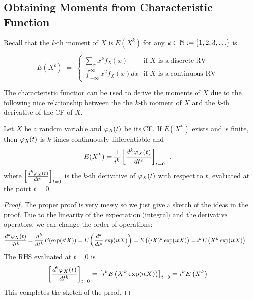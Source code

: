 \subsection{Obtaining Moments from Characteristic Function}

Recall that the $k$-th moment of $X$ is $E(X^k)$ for any $k \in \mathbb{N}:=\{1,2,3,\ldots\}$ is
\begin{framed}
\[
E(X^k)\; =\;
\begin{cases}
\displaystyle \sum_x x^k f_X(x) & \text{if $X$ is a discrete RV}\\[12pt]
\displaystyle \int_{-\infty}^{\infty} x^2 f_X(x) dx & \text{if $X$ is a continuous RV}
\end{cases}
\]
\end{framed}

The characteristic function can be used to derive the moments of $X$ due to the following nice relationship between the the $k$-th moment of $X$ and the $k$-th derivative of the CF of $X$.

\begin{framed}
\begin{prop}[Moment \& CF.]
Let $X$ be a random variable and $\varphi_X(t)$ be its CF.  
If $E(X^k)$ exists and is finite, then $\varphi_X(t)$ is $k$ times continuously differentiable and
\begin{equation*}
E(X^k) = \frac{1}{\imath^k} \left[\frac{d^k \varphi_X(t)}{dt^k}\right]_{t=0} \enspace .
\end{equation*}
where $\left[\frac{d^k \varphi_X(t)}{dt^k}\right]_{t=0}$ is the $k$-th derivative of $\varphi_X(t)$ with respect to $t$, evaluated at the point $t=0$.
\end{prop}
\end{framed}

\begin{proof}
The proper proof is very messy so we just give a sketch of the ideas in the proof.  
Due to the linearity of the expectation (integral) and the derivative operators, we can change the order of operations:
\begin{align*}
\frac{d^k \varphi_X(t)}{dt^k}
&= \frac{d^k}{dt^k} E(\exp(\imath t X))
= E \left( \frac{d^k}{dt^k} \exp(\imath t X) \right)
= E \left( (\imath X)^k \exp(\imath t X) \right)
= \imath^k E \left( X^k \exp(\imath t X) \right)
\end{align*}
The RHS evaluated at $t=0$ is
\[
\left[ \frac{d^k \varphi_X(t)}{dt^k} \right]_{t=0}
= \left[ \imath^k E \left( X^k \exp(\imath t X) \right) \right]_{t=0} 
= \imath^k E \left( X^k \right)
\]
This completes the sketch of the proof.
\end{proof}

